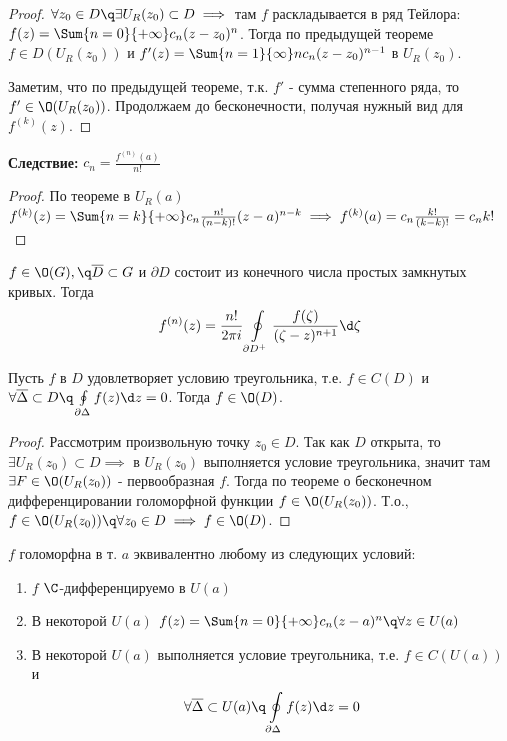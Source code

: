 \begin{proof}
  $\forall z_0\in D\q\exists U_R(z_0)\subset D\implies$ там $f$ раскладывается в ряд Тейлора: $f(z)=\Sum{n=0}{+\infty}c_n(z-z_0)^n$. Тогда по предыдущей теореме $f\in D(U_R(z_0))$ и $f'(z)=\Sum{n=1}{\infty}nc_n(z-z_0)^{n-1}$ в $U_R(z_0)$.

  Заметим, что по предыдущей теореме, т.к. $f'$ - сумма степенного ряда, то $f'\in\O(U_R(z_0))$. Продолжаем до бесконечности, получая нужный вид для $f^{(k)}(z)$.
\end{proof}
\textbf{Следствие:} $c_n=\frac{f^{(n)}(a)}{n!}$
\begin{proof}
  По теореме в $U_R(a)$ $f^{(k)}(z)=\Sum{n=k}{+\infty}c_n \frac{n!}{(n-k)!}(z-a)^{n-k}\implies f^{(k)}(a)=c_n \frac{k!}{(k-k)!}=c_nk!$ 
\end{proof}
\begin{theorem}
  $f\in\O(G),\q \overline{D}\subset G$ и $\partial D$ состоит из конечного числа простых замкнутых кривых. Тогда
  \[f^{(n)}(z)=\frac{n!}{2\pi i} \oint\limits_{\partial D^+}\frac{f(\zeta)}{(\zeta - z)^{n+1}}\d \zeta\]
\end{theorem}
\begin{theorem}[(Мореры)]
  Пусть $f$ в $D$ удовлетворяет условию треугольника, т.е. $f\in C(D)$ и $\forall \overline{\Delta}\subset D\q \oint\limits_{\partial \Delta}f(z)\d z=0$. Тогда $f\in\O(D)$. 
\end{theorem}
\begin{proof}
  Рассмотрим произвольную точку $z_0\in D$. Так как $D$ открыта, то $\exists U_R(z_0)\subset D\implies$ в $U_R(z_0)$ выполняется условие треугольника, значит там $\exists F\in\O(U_R(z_0))$ - первообразная $f$. Тогда по теореме о бесконечном дифференцировании голоморфной функции $f\in\O(U_R(z_0))$. Т.о., $f\in\O(U_R(z_0))\q\forall z_0\in D\implies f\in\O(D)$.
\end{proof}
\begin{theorem}
  $f$ голоморфна в т. $a$ эквивалентно любому из следующих условий: 
  \begin{enumerate}
    \item $f$ $\C$-дифференцируемо в $U(a)$
    \item В некоторой $U(a)$ $f(z)=\Sum{n=0}{+\infty}c_n(z-a)^n\q\forall z\in U(a)$ 
    \item В некоторой $U(a)$ выполняется условие треугольника, т.е. $f\in C(U(a))$ и \[\forall\overline{\Delta}\subset U(a)\q \oint\limits_{\partial \Delta}f(z)\d z=0\] 
  \end{enumerate}
\end{theorem}
